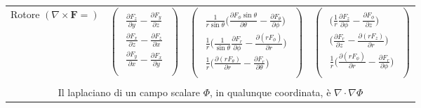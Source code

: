 \documentclass{book}
\newcommand{\h}{\mathbf}
\begin{document}
\begin{tabular}{|c|c|c|c|}
    {Rotore $(\nabla\times\h{F}=)$ }
    & {$\left( \begin{array}{c} \begin{aligned}
         \frac{\partial F_z}{\partial y}-\frac{\partial F_y}{\partial z} \\ 
         \frac{\partial F_x}{\partial z}-\frac{\partial F_z}{\partial x} \\ 
         \frac{\partial F_y}{\partial x}-\frac{\partial F_x}{\partial y} \\     
    \end{aligned} \end{array} \right) $}
    & {$\left(\begin{array}{c} \begin{aligned}
        \frac{1}{r \sin \theta} \biggl(\frac{\partial F_\phi \sin\theta}{\partial \theta}-\frac{\partial F_\theta}{\partial \phi}\biggr) \\
        \frac{1}{r}\biggl(\frac{1}{\sin\theta}\frac{\partial F_r}{\partial \phi}-\frac{\partial (r F_\phi)}{\partial r} \biggr) \\
        \frac{1}{r}\biggl(\frac{\partial (r F_\theta)}{\partial r}-\frac{\partial F_r}{\partial \theta}\biggr) \\       
    \end{aligned} \end{array}\right) $}
    & {$\left(\begin{array}{c} \begin{aligned}
        \biggl(\frac{1}{r}\frac{\partial F_z}{\partial \phi}-\frac{\partial F_\phi}{\partial z}\biggr) \\
        \biggl(\frac{\partial F_r}{\partial z}-\frac{\partial (r F_z)}{\partial r} \biggr) \\
        \frac{1}{r}\biggl(\frac{\partial (r F_\phi)}{\partial r}-\frac{\partial F_r}{\partial \phi}\biggr) \\
    \end{aligned} \end{array}\right) $} \\
    & & & \\ \hline
    \multicolumn{4}{|c|}{Il laplaciano di un campo scalare $\Phi$, in qualunque coordinata, è $\nabla\cdot\nabla\Phi$} \\
    \hline
\end{tabular}
\end{document}
